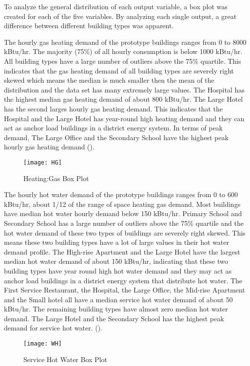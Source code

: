 To analyze the general distribution of each output variable, a box
plot was created for each of the five variables. By analyzing each
single output, a great difference between different
building types was apparent.

The hourly gas heating demand of the prototype buildings ranges from 0
to 8000 kBtu/hr. The majority (75\%) of all hourly consumption is
below 1000 kBtu/hr. All building types have a large number of outliers
above the 75\% quartile. This indicates that the gas heating demand of
all building types are severely right skewed which means the median is
much smaller then the mean of the distribution and the data set has
many extremely large values. The Hospital has the highest median gas
heating demand of about 800 kBtu/hr. The Large Hotel has the second
larges hourly gas heating demand. This indicates that the Hospital and
the Large Hotel has year-round high heating demand and they can act as
anchor load buildings in a district energy system. In terms of peak
demand, The Large Office and the Secondary School have the highest
peak hourly gas heating demand ().
\begin{figure}[h!]
  \centering
  \texttt{[image: HG]}
  \caption[Heating:Gas Box Plot]{Heating:Gas Box Plot}
  \label{fig:HG}
\end{figure}%

The hourly hot water demand of the prototype buildings ranges from 0
to 600 kBtu/hr, about 1/12 of the range of space heating gas
demand. Most buildings have median hot water hourly demand below 150
kBtu/hr. Primary School and Secondary School has a large number of
outliers above the 75\% quartile and the hot water demand of these two
types of buildings are severely right skewed. This means these two
building types have a lot of large values in their hot water demand
profile. The High-rise Apartment and the Large Hotel have the largest
median hot water demand of about 150 kBtu/hr, indicating that these
two building types have year round high hot water demand and they may
act as anchor load buildings in a district energy system that
distribute hot water. The First Service Restaurant, the Hospital, the
Large Office, the Mid-rise Apartment and the Small hotel all have a
median service hot water demand of about 50 kBtu/hr. The remaining
building types have almost zero median hot water demand. The Large
Hotel and the Secondary School has the highest peak demand for service
hot water. ().
\begin{figure}[h!]
  \centering
  \texttt{[image: WH]}
  \caption[Service Hot Water Box Plot]{Service Hot Water Box Plot}
  \label{fig:WH}
\end{figure}%

